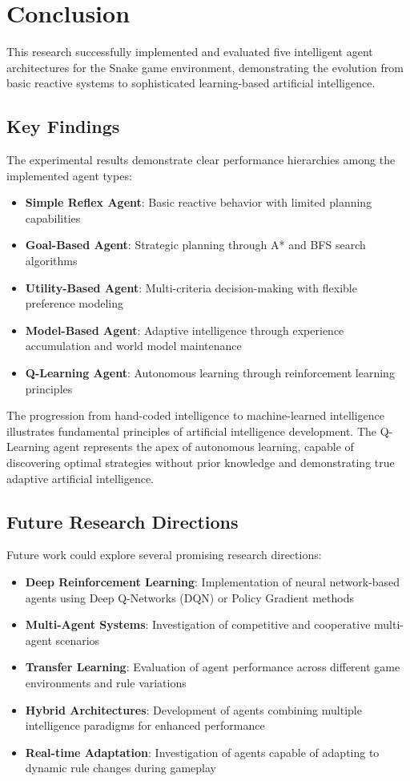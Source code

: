 \documentclass[11pt,a4paper]{article}
\begin{document}
\section{Conclusion}

This research successfully implemented and evaluated five intelligent agent architectures for the Snake game environment, demonstrating the evolution from basic reactive systems to sophisticated learning-based artificial intelligence.

\subsection{Key Findings}
The experimental results demonstrate clear performance hierarchies among the implemented agent types:

\begin{itemize}
\item \textbf{Simple Reflex Agent}: Basic reactive behavior with limited planning capabilities
\item \textbf{Goal-Based Agent}: Strategic planning through A* and BFS search algorithms
\item \textbf{Utility-Based Agent}: Multi-criteria decision-making with flexible preference modeling
\item \textbf{Model-Based Agent}: Adaptive intelligence through experience accumulation and world model maintenance
\item \textbf{Q-Learning Agent}: Autonomous learning through reinforcement learning principles
\end{itemize}

The progression from hand-coded intelligence to machine-learned intelligence illustrates fundamental principles of artificial intelligence development. The Q-Learning agent represents the apex of autonomous learning, capable of discovering optimal strategies without prior knowledge and demonstrating true adaptive artificial intelligence.

\subsection{Future Research Directions}

Future work could explore several promising research directions:

\begin{itemize}
\item \textbf{Deep Reinforcement Learning}: Implementation of neural network-based agents using Deep Q-Networks (DQN) or Policy Gradient methods
\item \textbf{Multi-Agent Systems}: Investigation of competitive and cooperative multi-agent scenarios
\item \textbf{Transfer Learning}: Evaluation of agent performance across different game environments and rule variations
\item \textbf{Hybrid Architectures}: Development of agents combining multiple intelligence paradigms for enhanced performance
\item \textbf{Real-time Adaptation}: Investigation of agents capable of adapting to dynamic rule changes during gameplay
\end{itemize}
\end{document}
